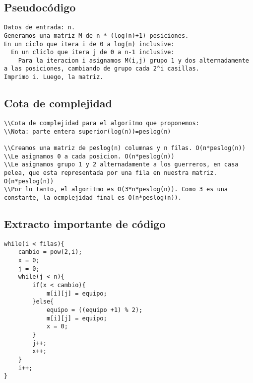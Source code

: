 \documentclass[10pt,a4paper]{article}
\begin{document}
\subsection{Pseudocódigo}
\begin{verbatim}
Datos de entrada: n.
Generamos una matriz M de n * (log(n)+1) posiciones.
En un ciclo que itera i de 0 a log(n) inclusive:
  En un cliclo que itera j de 0 a n-1 inclusive:
    Para la iteracion i asignamos M(i,j) grupo 1 y dos alternadamente a las posiciones, cambiando de grupo cada 2^i casillas.
Imprimo i. Luego, la matriz.
\end{verbatim}

\subsection{Cota de complejidad}
\begin{verbatim}
\\Cota de complejidad para el algoritmo que proponemos:
\\Nota: parte entera superior(log(n))=peslog(n)

\\Creamos una matriz de peslog(n) columnas y n filas. O(n*peslog(n))
\\Le asignamos 0 a cada posicion. O(n*peslog(n))
\\Le asignamos grupo 1 y 2 alternadamente a los guerreros, en casa pelea, que esta representada por una fila en nuestra matriz. O(n*peslog(n))
\\Por lo tanto, el algoritmo es O(3*n*peslog(n)). Como 3 es una constante, la ocmplejidad final es O(n*peslog(n)).
\end{verbatim}

\subsection{Extracto importante de código}
\begin{lstlisting}
while(i < filas){
	cambio = pow(2,i);
	x = 0;
	j = 0;
	while(j < n){
		if(x < cambio){
			m[i][j] = equipo;
		}else{
			equipo = ((equipo +1) % 2);
			m[i][j] = equipo;
			x = 0;
		}
		j++;
		x++;
	}
	i++;
}
\end{lstlisting}

\subsection{}
\end{document}
